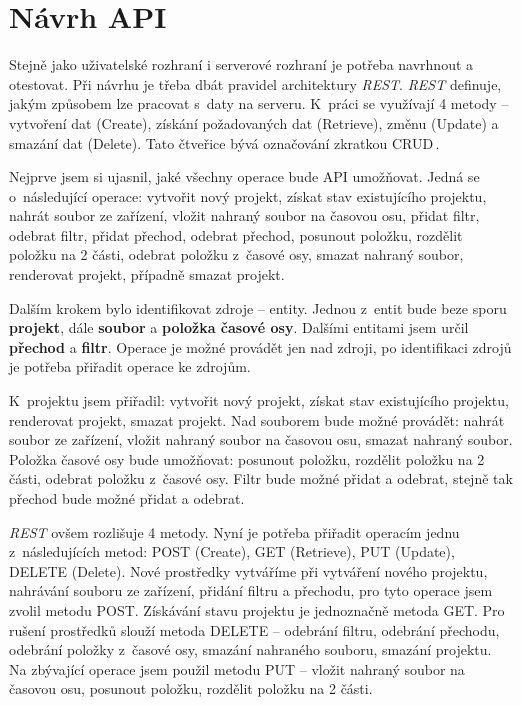 \section{Návrh API}
Stejně jako uživatelské rozhraní i serverové rozhraní je potřeba navrhnout a otestovat. Při návrhu je třeba dbát pravidel architektury \textit{REST}. \textit{REST} definuje, jakým způsobem lze pracovat s~daty na serveru. K~práci se využívají 4 metody -- vytvoření dat (Create), získání požadovaných dat (Retrieve), změnu (Update) a smazání dat (Delete). Tato čtveřice bývá označování zkratkou CRUD\,\cite{rest}.

Nejprve jsem si ujasnil, jaké všechny operace bude API umožňovat. Jedná se o~následující operace: vytvořit nový projekt, získat stav existujícího projektu, nahrát soubor ze zařízení, vložit nahraný soubor na časovou osu, přidat filtr, odebrat filtr, přidat přechod, odebrat přechod, posunout položku, rozdělit položku na 2 části, odebrat položku z~časové osy, smazat nahraný soubor, renderovat projekt, případně smazat projekt.

Dalším krokem bylo identifikovat zdroje -- entity. Jednou z~entit bude beze sporu \textbf{projekt}, dále \textbf{soubor} a \textbf{položka časové osy}. Dalšími entitami jsem určil \textbf{přechod} a \textbf{filtr}. Operace je možné provádět jen nad zdroji, po identifikaci zdrojů je potřeba přiřadit operace ke zdrojům.

K~projektu jsem přiřadil: vytvořit nový projekt, získat stav existujícího projektu, renderovat projekt, smazat projekt. Nad souborem bude možné provádět: nahrát soubor ze zařízení, vložit nahraný soubor na časovou osu, smazat nahraný soubor. Položka časové osy bude umožňovat: posunout položku, rozdělit položku na 2 části, odebrat položku z~časové osy. Filtr bude možné přidat a odebrat, stejně tak přechod bude možné přidat a odebrat.

\textit{REST} ovšem rozlišuje 4 metody. Nyní je potřeba přiřadit operacím jednu z~následujících metod: POST (Create), GET (Retrieve), PUT (Update), DELETE (Delete). Nové prostředky vytváříme při vytváření nového projektu, nahrávání souboru ze zařízení, přidání filtru a přechodu, pro tyto operace jsem zvolil metodu POST. Získávání stavu projektu je jednoznačně metoda GET. Pro rušení prostředků slouží metoda DELETE -- odebrání filtru, odebrání přechodu, odebrání položky z~časové osy, smazání nahraného souboru, smazání projektu. Na zbývající operace jsem použil metodu PUT -- vložit nahraný soubor na časovou osu, posunout položku, rozdělit položku na 2 části.

